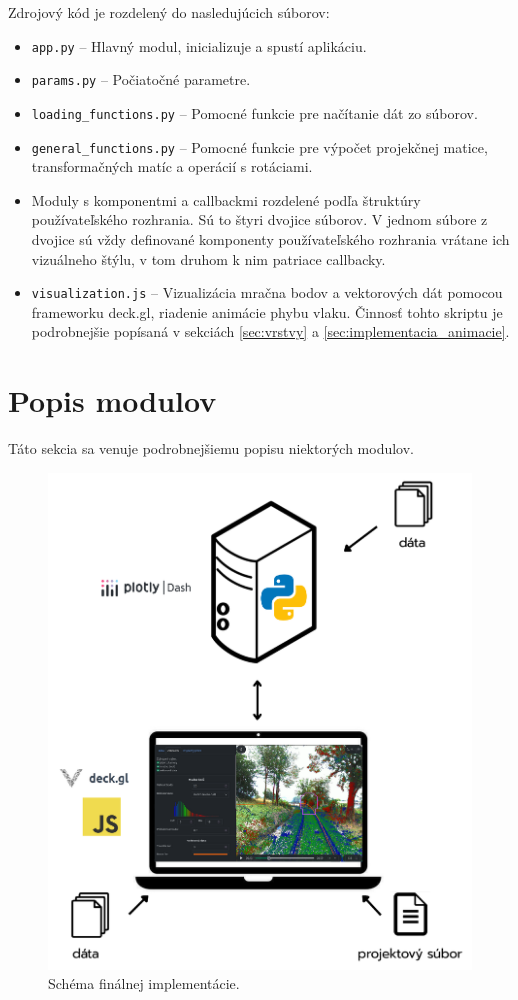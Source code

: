 Zdrojový kód je rozdelený do nasledujúcich súborov:
\begin{itemize}
    \item \texttt{app.py} -- Hlavný modul, inicializuje a spustí aplikáciu.
    \item \texttt{params.py} -- Počiatočné parametre.
    \item \texttt{loading\_functions.py} -- Pomocné funkcie pre načítanie dát zo súborov.
    \item \texttt{general\_functions.py} -- Pomocné funkcie pre výpočet projekčnej matice, transformačných matíc a operácií s rotáciami.
    \item Moduly s komponentmi a callbackmi rozdelené podľa štruktúry používateľského rozhrania. Sú to štyri dvojice súborov. V jednom súbore z dvojice sú vždy definované komponenty používateľského rozhrania vrátane ich vizuálneho štýlu, v tom druhom k nim patriace callbacky.
    \item \texttt{visualization.js} -- Vizualizácia mračna bodov a vektorových dát pomocou frameworku deck.gl, riadenie animácie phybu vlaku. Činnosť tohto skriptu je podrobnejšie popísaná v sekciách \ref{sec:vrstvy} a \ref{sec:implementacia_animacie}. 
\end{itemize}

\section{Popis modulov}

Táto sekcia sa venuje podrobnejšiemu popisu niektorých modulov.

\begin{figure}[t]
    \centering
    \includegraphics[width=0.7\linewidth]{text_prace/obrazky-figures/schema_implementacie.pdf}
    \caption{Schéma finálnej implementácie.}
    \label{fig:schema_implementacie}
\end{figure}

